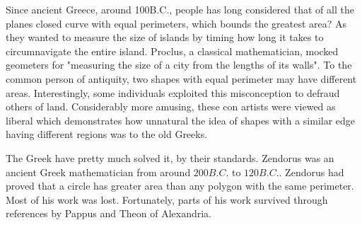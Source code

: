 \documentclass[a4paper]{book}
\begin{document}
Since ancient Greece, around 100B.C., people has long considered that of all the planes closed curve with equal perimeters, which bounds the greatest area? As they wanted to measure the size of islands by timing how long it takes to circumnavigate the entire island. Proclus, a classical mathematician, mocked geometers for "measuring the size of a city from the lengths of its walls". To the common person of antiquity, two shapes with equal perimeter may have different areas. Interestingly, some individuals exploited this misconception to defraud others of land. Considerably more amusing, these con artists were viewed as liberal which demonstrates how unnatural the idea of shapes with a similar edge having different regions was to the old Greeks.

The Greek have pretty much solved it, by their standards. Zendorus was an ancient Greek mathematician from around $200B.C.$ to $120B.C.$. Zendorus had proved that a circle has greater area than any polygon with the same perimeter. Most of his work was lost. Fortunately, parts of his work survived through references by Pappus and Theon of Alexandria.
\end{document}
